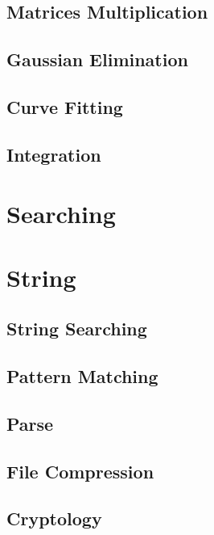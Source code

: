		\section{Matrices Multiplication}

		\section{Gaussian Elimination}

		\section{Curve Fitting}

		\section{Integration}

		\section{}

	\chapter{Searching}

	\chapter{String}
		\section{String Searching}

		\section{Pattern Matching}

		\section{Parse}

		\section{File Compression}

		\section{Cryptology}

